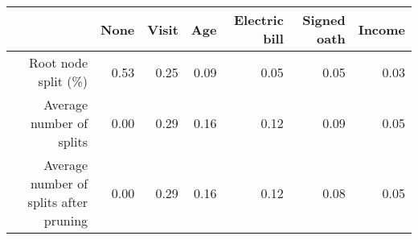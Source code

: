 \begin{tabular}{rrrrrrr}
  \hline
 & None & Visit & Age & Electric bill & Signed oath & Income \\ 
  \hline
Root node split (\%) & 0.53 & 0.25 & 0.09 & 0.05 & 0.05 & 0.03 \\ 
  Average number of splits & 0.00 & 0.29 & 0.16 & 0.12 & 0.09 & 0.05 \\ 
  Average number of splits after pruning & 0.00 & 0.29 & 0.16 & 0.12 & 0.08 & 0.05 \\ 
   \hline
\end{tabular}

